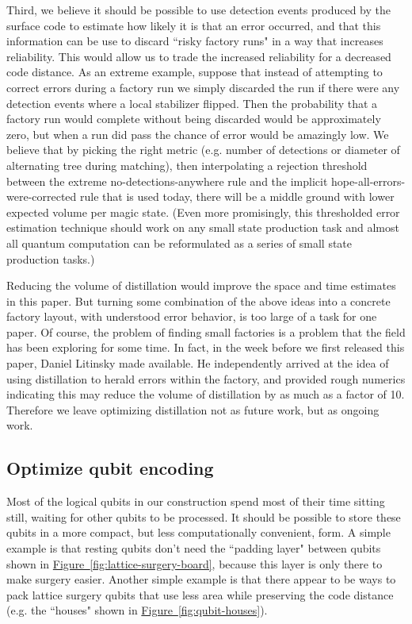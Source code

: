 \documentclass[superscriptaddress,notitlepage,longbibliography]{revtex4-1}
\theoremstyle{definition}
\theoremstyle{definition}
\newcommand{\fig}[1]{\hyperref[fig:#1]{Figure~\ref*{fig:#1}}}
\begin{document}
Third, we believe it should be possible to use detection events produced by the surface code to estimate how likely it is that an error occurred, and that this information can be use to discard ``risky factory runs" in a way that increases reliability.
This would allow us to trade the increased reliability for a decreased code distance.
As an extreme example, suppose that instead of attempting to correct errors during a factory run we simply discarded the run if there were any detection events where a local stabilizer flipped.
Then the probability that a factory run would complete without being discarded would be approximately zero, but when a run did pass the chance of error would be amazingly low.
We believe that by picking the right metric (e.g. number of detections or diameter of alternating tree during matching), then interpolating a rejection threshold between the extreme no-detections-anywhere rule and the implicit hope-all-errors-were-corrected rule that is used today, there will be a middle ground with lower expected volume per magic state.
(Even more promisingly, this thresholded error estimation technique should work on any small state production task and almost all quantum computation can be reformulated as a series of small state production tasks.)

Reducing the volume of distillation would improve the space and time estimates in this paper.
But turning some combination of the above ideas into a concrete factory layout, with understood error behavior, is too large of a task for one paper.
Of course, the problem of finding small factories is a problem that the field has been exploring for some time.
In fact, in the week before we first released this paper, Daniel Litinsky made \cite{litinski2019magic} available.
He independently arrived at the idea of using distillation to herald errors within the factory, and provided rough numerics indicating this may reduce the volume of distillation by as much as a factor of 10.
Therefore we leave optimizing distillation not as future work, but as ongoing work.


\subsection{Optimize qubit encoding}

Most of the logical qubits in our construction spend most of their time sitting still, waiting for other qubits to be processed.
It should be possible to store these qubits in a more compact, but less computationally convenient, form.
A simple example is that resting qubits don't need the ``padding layer" between qubits shown in \fig{lattice-surgery-board}, because this layer is only there to make surgery easier.
Another simple example is that there appear to be ways to pack lattice surgery qubits that use less area while preserving the code distance (e.g. the ``houses" shown in \fig{qubit-houses}).
\end{document}

